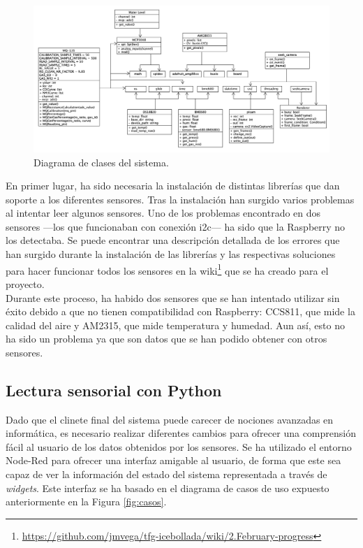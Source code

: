 \begin{figure} [h!]
  \begin{center}
    \includegraphics[width=17cm]{figs/umlet}
  \end{center}
  \caption{Diagrama de clases del sistema.}
  \label{fig:umlet}
\end{figure}

En primer lugar, ha sido necesaria la instalación de distintas librerías que dan soporte a los diferentes sensores. Tras la instalación han surgido varios problemas al intentar leer algunos sensores. Uno de los problemas encontrado en dos sensores ---los que funcionaban con conexión i2c--- ha sido que la Raspberry no los detectaba. Se puede encontrar una descripción detallada de los errores que han surgido durante la instalación de las librerías y las respectivas soluciones para hacer funcionar todos los sensores en la wiki\footnote{\url{https://github.com/jmvega/tfg-icebollada/wiki/2.February-progress}} que se ha creado para el proyecto.\\

Durante este proceso, ha habido dos sensores que se han intentado utilizar sin éxito debido a que no tienen compatibilidad con Raspberry: CCS811, que mide la calidad del aire y AM2315, que mide temperatura y humedad. Aun así, esto no ha sido un problema ya que son datos que se han podido obtener con otros sensores.\\

\subsection{Lectura sensorial con Python}
\label{sec:ficheropython}
Dado que el clinete final del sistema puede carecer de nociones avanzadas en informática, es necesario realizar diferentes cambios para ofrecer una comprensión fácil al usuario de los datos obtenidos por los sensores. Se ha utilizado el entorno Node-Red para ofrecer una interfaz amigable al usuario, de forma que este sea capaz de ver la información del estado del sistema representada a través de \textit{widgets}. Este interfaz se ha basado en el diagrama de casos de uso expuesto anteriormente en la Figura \ref{fig:casos}.\\

